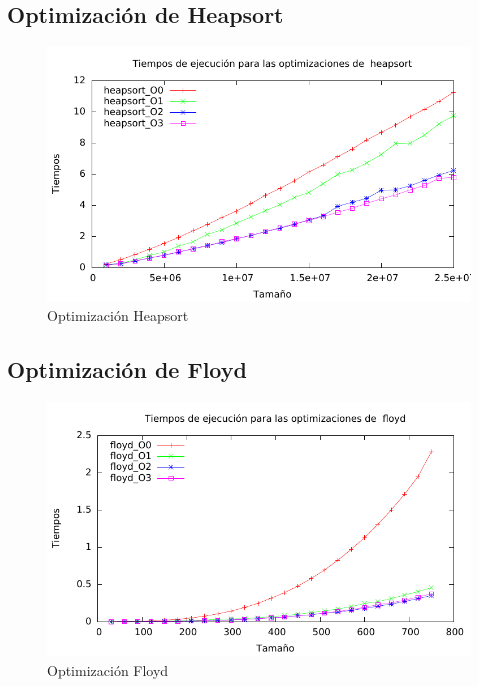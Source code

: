 \documentclass[a4paper, 11pt]{article}
\begin{document}
\subsection{Optimización de Heapsort}

\begin{figure}[H]\includegraphics[width=13cm]{img/heapsort_optim_g.pdf} \centering
	\caption{Optimización Heapsort}\end{figure}

\subsection{Optimización de Floyd}

\begin{figure}[H]\includegraphics[width=13cm]{img/floyd_optim_g.pdf} \centering
	\caption{Optimización Floyd}\end{figure}
\end{document}
